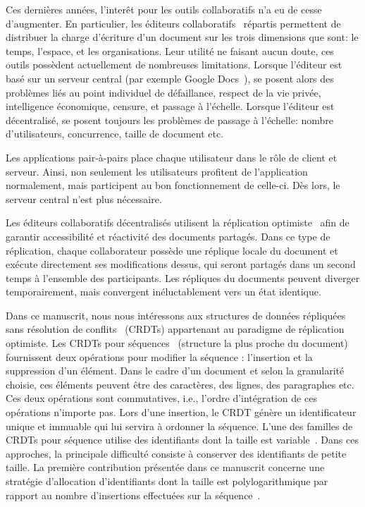 
Ces dernières années, l'interêt pour les outils collaboratifs n'a eu de cesse
d'augmenter. En particulier, les éditeurs
collaboratifs~\cite{ellis1991groupware} répartis permettent de distribuer la
charge d'écriture d'un document sur les trois dimensions que sont: le temps,
l'espace, et les organisations. Leur utilité ne faisant aucun doute, ces outils
possèdent actuellement de nombreuses limitations. Lorsque l'éditeur est basé sur
un serveur central (par exemple Google Docs~\cite{nichols1995high}), se posent
alors des problèmes liés au point individuel de défaillance, respect de la vie
privée, intelligence économique, censure, et passage à l'échelle. Lorsque
l'éditeur est décentralisé, se posent toujours les problèmes de passage à
l'échelle: nombre d'utilisateurs, concurrence, taille de document etc.

Les applications pair-à-pairs place chaque utilisateur dans le rôle de client et
serveur. Ainsi, non seulement les utilisateurs profitent de l'application
normalement, mais participent au bon fonctionnement de celle-ci. Dès lors, le
serveur central n'est plus nécessaire.

Les éditeurs collaboratifs décentralisés utilisent la réplication
optimiste~\cite{saito2005optimistic} afin de garantir accessibilité et
réactivité des documents partagés. Dans ce type de réplication, chaque
collaborateur possède une réplique locale du document et exécute directement ses
modifications dessus, qui seront partagés dans un second temps à l'ensemble des
participants. Les répliques du documents peuvent diverger temporairement, mais
convergent inéluctablement vers un état identique.

Dans ce manuscrit, nous nous intéressons aux structures de données répliquées
sans résolution de conflits~\cite{shapiro2011comprehensive, shapiro2011conflict}
(CRDTs) appartenant au paradigme de réplication optimiste. Les CRDTs pour
séquences~\cite{ahmed2011evaluating, conway2014language, grishchenko2010deep,
  oster2006data, preguica2009commutative, roh2011replicated, weiss2007wooki,
  wu2010partial, Yu2012stringwise, andre2013supporting, weiss2009logoot}
(structure la plus proche du document) fournissent deux opérations pour modifier
la séquence : l'insertion et la suppression d'un élément. Dans le cadre d'un
document et selon la granularité choisie, ces éléments peuvent être des
caractères, des lignes, des paragraphes etc. Ces deux opérations sont
commutatives, i.e., l'ordre d'intégration de ces opérations n'importe pas. Lors
d'une insertion, le CRDT génère un identificateur unique et immuable qui lui
servira à ordonner la séquence. L'une des familles de CRDTs pour séquence
utilise des identifiants dont la taille est
variable~\cite{preguica2009commutative,
  andre2013supporting,weiss2009logoot}. Dans ces approches, la principale
difficulté consiste à conserver des identifiants de petite taille. La première
contribution présentée dans ce manuscrit concerne une stratégie d'allocation
d'identifiants dont la taille est polylogarithmique par rapport au nombre
d'insertions effectuées sur la séquence~\cite{nedelec2013lseq,
  nedelec2013concurrency}.

